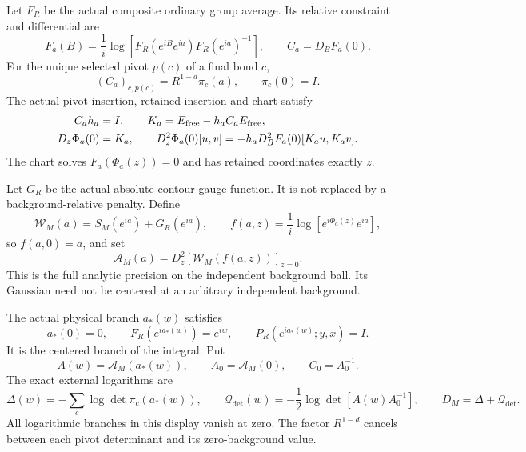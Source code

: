 \documentclass[11pt]{article}
\theoremstyle{remark}
\begin{document}
Let \(F_R\) be the actual composite ordinary group average. Its
relative constraint and differential are
\begin{equation}
 F_a(B)=\frac1i\log\!\left[
     F_R(e^{iB}e^{ia})F_R(e^{ia})^{-1}\right],
 \qquad C_a=D_BF_a(0).
 \label{dmt-relative-constraint}
\end{equation}
For the unique selected pivot \(p(c)\) of a final bond \(c\),
\begin{equation}
 (C_a)_{c,p(c)}=R^{1-d}\pi_c(a),\qquad
 \pi_c(0)=I.
 \label{dmt-pivot-block}
\end{equation}
The actual pivot insertion, retained insertion and chart satisfy
\begin{align}
 C_ah_a&=I,\qquad
 K_a=E_{\rm free}-h_aC_aE_{\rm free},\notag\\
 D_z\Phi_a(0)&=K_a,\qquad
 D_z^2\Phi_a(0)[u,v]
       =-h_aD_B^2F_a(0)[K_au,K_av].
 \label{dmt-chart-identities}
\end{align}
The chart solves \(F_a(\Phi_a(z))=0\) and has retained
coordinates exactly \(z\).

Let \(G_R\) be the actual absolute contour gauge function.
It is not replaced by a background-relative penalty. Define
\begin{equation}
 \mathcal W_M(a)=S_M(e^{ia})+G_R(e^{ia}),\qquad
 f(a,z)=\frac1i\log[e^{i\Phi_a(z)}e^{ia}],
 \label{dmt-pulled-action}
\end{equation}
so \(f(a,0)=a\), and set
\begin{equation}
 \mathscr A_M(a)
    =D_z^2[\mathcal W_M(f(a,z))]_{z=0}.
 \label{dmt-independent-precision}
\end{equation}
This is the full analytic precision on the independent
background ball. Its Gaussian need not be centered at an
arbitrary independent background.

The actual physical branch \(a_*(w)\) satisfies
\[
 a_*(0)=0,\qquad F_R(e^{ia_*(w)})=e^{iw},\qquad
 P_R(e^{ia_*(w)};y,x)=I.
\]
It is the centered branch of the integral. Put
\begin{equation}
 A(w)=\mathscr A_M(a_*(w)),\qquad
 A_0=\mathscr A_M(0),\qquad C_0=A_0^{-1}.
 \label{dmt-physical-precision}
\end{equation}
The exact external logarithms are
\begin{equation}
 \Delta(w)=-\sum_c\log\det\pi_c(a_*(w)),\qquad
 \mathcal Q_{\det}(w)
       =-\frac12\log\det[A(w)A_0^{-1}],\qquad
 D_M=\Delta+\mathcal Q_{\det}.
 \label{dmt-leading-correction}
\end{equation}
All logarithmic branches in this display vanish at zero.
The factor \(R^{1-d}\) cancels between each pivot determinant
and its zero-background value.
\end{document}
